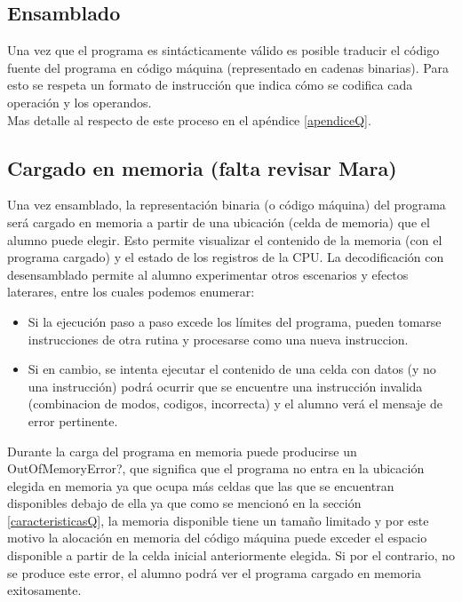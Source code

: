 \subsection{Ensamblado}

Una vez que el programa es sintácticamente válido es posible traducir el código fuente del programa en código máquina (representado en cadenas binarias). Para esto se respeta un formato de instrucción que indica cómo se codifica cada operación y los operandos. \\
Mas detalle al respecto de este proceso en el apéndice \ref{apendiceQ}.

\subsection{Cargado en memoria (falta revisar Mara)}

Una vez ensamblado, la representación binaria (o código máquina) del programa será cargado en memoria a partir de una ubicación (celda de memoria) que el alumno puede elegir. Esto permite visualizar el contenido de la memoria (con el programa cargado) y el estado de los registros de la CPU. La decodificación con desensamblado permite al alumno experimentar otros escenarios y efectos laterares, entre los cuales podemos enumerar:

\begin{itemize}
\item Si la ejecución paso a paso excede los límites del programa, pueden tomarse instrucciones de otra rutina y procesarse como una nueva instruccion.
\item Si en cambio, se intenta ejecutar el contenido de una celda con datos (y no una instrucción) podrá ocurrir que se encuentre una instrucción invalida (combinacion de modos, codigos, incorrecta) y el alumno verá el mensaje de error pertinente.
\end{itemize}

Durante la carga del programa en memoria puede producirse un OutOfMemoryError?, que significa que el programa no entra en la ubicación elegida en memoria ya que ocupa más celdas que las que se encuentran disponibles debajo de ella ya que como se mencionó en la sección \ref{caracteristicasQ}, la memoria disponible tiene un tamaño limitado y por este motivo la alocación en memoria del código máquina puede exceder el espacio disponible a partir de la celda inicial anteriormente elegida. Si por el contrario, no se produce este error, el alumno podrá ver el programa cargado en memoria exitosamente.

